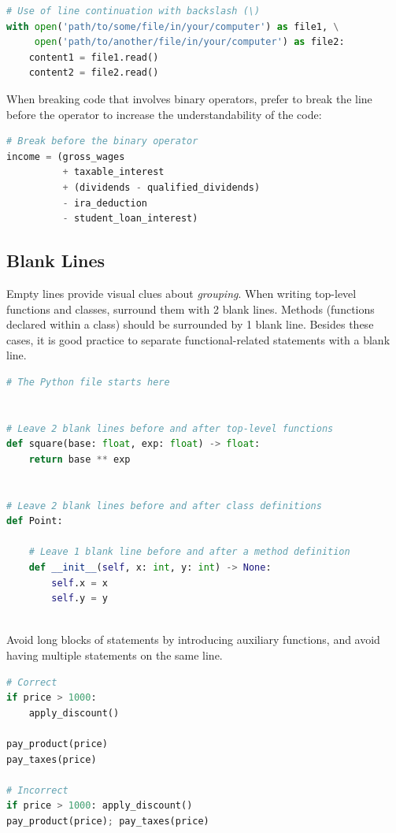 \documentclass{tufte-handout}
\begin{document}
\begin{lstlisting}[numbers=none,language=python]
# Use of line continuation with backslash (\)
with open('path/to/some/file/in/your/computer') as file1, \
     open('path/to/another/file/in/your/computer') as file2:
    content1 = file1.read()
    content2 = file2.read()
\end{lstlisting}

When breaking code that involves binary operators, prefer to break the line before the operator to increase the understandability of the code:

\begin{lstlisting}[numbers=none,language=python]
# Break before the binary operator
income = (gross_wages
          + taxable_interest
          + (dividends - qualified_dividends)
          - ira_deduction
          - student_loan_interest)
\end{lstlisting}

\subsection{Blank Lines}

Empty lines provide visual clues about \emph{grouping}.
When writing top-level functions and classes, surround them with 2 blank lines.
Methods (functions declared within a class) should be surrounded by 1 blank line.	
Besides these cases, it is good practice to separate functional-related statements with a blank line.

\begin{lstlisting}[numbers=none,language=python]
# The Python file starts here


# Leave 2 blank lines before and after top-level functions
def square(base: float, exp: float) -> float:
    return base ** exp


# Leave 2 blank lines before and after class definitions
def Point:
	
	# Leave 1 blank line before and after a method definition	
	def __init__(self, x: int, y: int) -> None:
	    self.x = x
	    self.y = y
     
\end{lstlisting}

Avoid long blocks of statements by introducing auxiliary functions, and avoid having multiple statements on the same line.

\begin{lstlisting}[numbers=none,language=python]
# Correct
if price > 1000:
    apply_discount()

pay_product(price)
pay_taxes(price)

# Incorrect
if price > 1000: apply_discount()
pay_product(price); pay_taxes(price)
\end{lstlisting}
\end{document}
